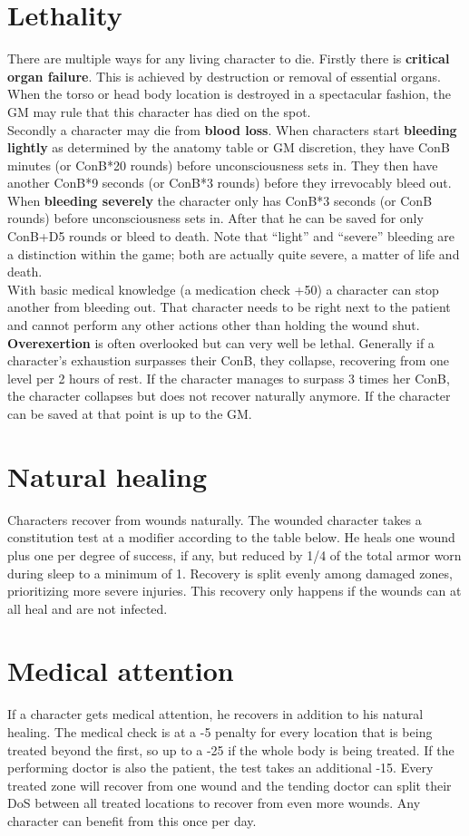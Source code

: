 \documentclass[12pt,a4paper,openany]{book}
\begin{document}
	\section{Lethality}
	There are multiple ways for any living character to die.
	Firstly there is \textbf{critical organ failure}. This is achieved by destruction or removal of essential organs. When the torso or head body location is destroyed in a spectacular fashion, the GM may rule that this character has died on the spot.\\
	Secondly a character may die from \textbf{blood loss}. When characters start \textbf{bleeding lightly} as determined by the anatomy table or GM discretion, they have ConB minutes (or ConB*20 rounds) before unconsciousness sets in. They then have another ConB*9 seconds (or ConB*3 rounds) before they irrevocably bleed out. When \textbf{bleeding severely} the character only has ConB*3 seconds (or ConB rounds) before unconsciousness sets in. After that he can be saved for only ConB+D5 rounds or bleed to death. Note that “light” and “severe” bleeding are a distinction within the game; both are actually quite severe, a matter of life and death.\\
	With basic medical knowledge (a medication check +50) a character can stop another from bleeding out. That character needs to be right next to the patient and cannot perform any other actions other than holding the wound shut.\\
	\textbf{Overexertion} is often overlooked but can very well be lethal. Generally if a character’s exhaustion surpasses their ConB, they collapse, recovering from one level per 2 hours of rest. If the character manages to surpass 3 times her ConB, the character collapses but does not recover naturally anymore. If the character can be saved at that point is up to the GM.
	\section{Natural healing}
	Characters recover from wounds naturally. The wounded character takes a constitution test at a modifier according to the table below. He heals one wound plus one per degree of success, if any, but reduced by 1/4 of the total armor worn during sleep to a minimum of 1. Recovery is split evenly among damaged zones, prioritizing more severe injuries. This recovery only happens if the wounds can at all heal and are not infected.
	\section{Medical attention}
	If a character gets medical attention, he recovers in addition to his natural healing. The medical check is at a -5 penalty for every location that is being treated beyond the first, so up to a -25 if the whole body is being treated. If the performing doctor is also the patient, the test takes an additional -15. Every treated zone will recover from one wound and the tending doctor can split their DoS between all treated locations to recover from even more wounds. Any character can benefit from this once per day.
\end{document}
